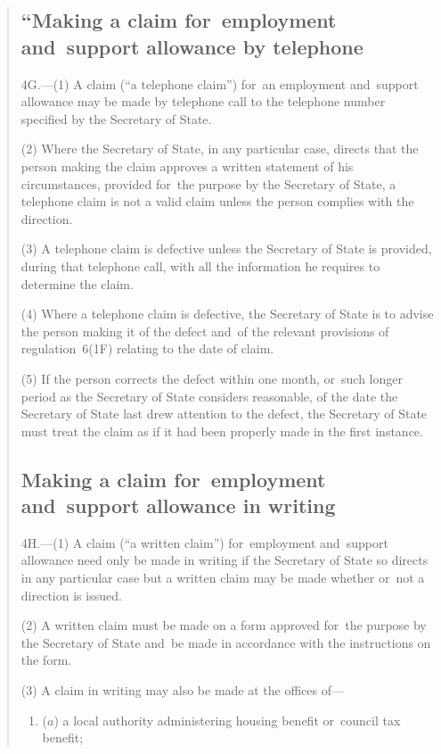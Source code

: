 \documentclass[12pt,a4paper]{article}
\begin{document}
\begin{quotation}
\subsection*{“Making a claim for~employment and~support allowance by telephone}

4G.---(1)  A claim (“a telephone claim”) for~an employment and~support allowance may be made by telephone call to the telephone number specified by the Secretary of State.

(2) Where the Secretary of State, in any particular case, directs that the person making the claim approves a written statement of his circumstances, provided for~the purpose by the Secretary of State, a telephone claim is not a valid claim unless the person complies with the direction.

(3) A telephone claim is defective unless the Secretary of State is provided, during that telephone call, with all the information he requires to determine the claim.

(4) Where a telephone claim is defective, the Secretary of State is to advise the person making it of the defect and~of the relevant provisions of regulation~6(1F) relating to the date of claim.

(5) If the person corrects the defect within one month, or~such longer period as the Secretary of State considers reasonable, of the date the Secretary of State last drew attention to the defect, the Secretary of State must treat the claim as if it had been properly made in the first instance.

\subsection*{Making a claim for~employment and~support allowance in writing}

4H.---(1)  A claim (“a written claim”) for~employment and~support allowance need only be made in writing if the Secretary of State so directs in any particular case but a written claim may be made whether or~not a direction is issued.

(2) A written claim must be made on a form approved for~the purpose by the Secretary of State and~be made in accordance with the instructions on the form.

(3) A claim in writing may also be made at the offices of—
\begin{enumerate}\item[]
($a$) a local authority administering housing benefit or~council tax benefit;


\end{enumerate}
\end{quotation}
\end{document}
